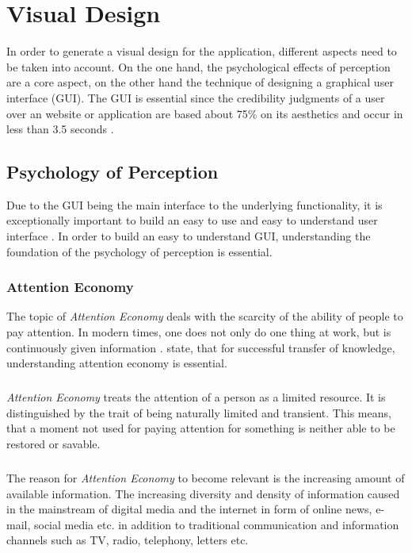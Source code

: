\chapter{Visual Design}
In order to generate a visual design for the application, different aspects need to be taken into account. On the one hand, the psychological effects of perception are a core aspect, on the other hand the technique of designing a graphical user interface (GUI). The GUI is essential since the credibility judgments of a user over an website or application are based about 75\% on its aesthetics and occur in less than 3.5 seconds \parencite[see.][1]{Alsudani.2009}.
\section{Psychology of Perception}
Due to the GUI being the main interface to the underlying functionality, it is exceptionally important to build an easy to use and easy to understand user interface \parencite[see.][2]{Dray.1995}. In order to build an easy to understand GUI, understanding the foundation of the psychology of perception is essential.
\subsection{Attention Economy}
The topic of \textit{Attention Economy} deals with the scarcity of the ability of people to pay attention. In modern times, one does not only do one thing at work, but is continuously given information  \parencite[see.][]{Davenport.2001}. \textcite{Davenport.2001} state, that for successful transfer of knowledge, understanding attention economy is essential. 
\paragraph*{} \textit{Attention Economy} treats the attention of a person as a limited resource. It is distinguished by the trait of being naturally limited and transient. This means, that a moment not used for paying attention for something is neither able to be restored or savable. \parencite[see.][]{Davenport.2001}
\paragraph*{} The reason for \textit{Attention Economy} to become relevant is the increasing amount of available information. The increasing diversity and density of information caused in the mainstream of digital media and the internet in form of online news, e-mail, social media etc. in addition to traditional communication and information channels such as TV, radio, telephony, letters etc.
